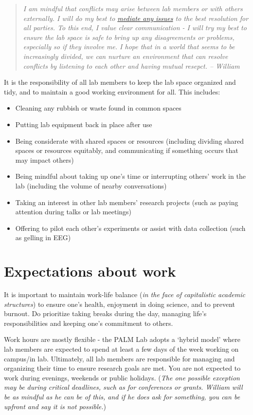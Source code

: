 \documentclass[
]{book}
\providecommand{\tightlist}{%
  \setlength{\itemsep}{0pt}\setlength{\parskip}{0pt}}
\begin{document}
\begin{quote}
\emph{I am mindful that conflicts may arise between lab members or with others externally. I will do my best to \protect\hyperlink{conflicts}{mediate any issues} to the best resolution for all parties. To this end, I value clear communication - I will try my best to ensure the lab space is safe to bring up any disagreements or problems, especially so if they involve me. I hope that in a world that seems to be increasingly divided, we can nurture an environment that can resolve conflicts by listening to each other and having mutual resepct. -- William}
\end{quote}

It is the responsibility of all lab members to keep the lab space organized and tidy, and to maintain a good working environment for all. This includes:

\begin{itemize}
\tightlist
\item
  Cleaning any rubbish or waste found in common spaces
\item
  Putting lab equipment back in place after use
\item
  Being considerate with shared spaces or resources (including dividing shared spaces or resources equitably, and communicating if something occurs that may impact others)
\item
  Being mindful about taking up one's time or interrupting others' work in the lab (including the volume of nearby conversations)
\item
  Taking an interest in other lab members' research projects (such as paying attention during talks or lab meetings)
\item
  Offering to pilot each other's experiments or assist with data collection (such as gelling in EEG)
\end{itemize}

\hypertarget{lab-work}{%
\section{Expectations about work}\label{lab-work}}

It is important to maintain work-life balance (\emph{in the face of capitalistic academic structures}) to ensure one's health, enjoyment in doing science, and to prevent burnout. Do prioritize taking breaks during the day, managing life's responsibilities and keeping one's commitment to others.

Work hours are mostly flexible - the PALM Lab adopts a `hybrid model' where lab members are expected to spend at least a few days of the week working on campus/in lab. Ultimately, all lab members are responsible for managing and organizing their time to ensure research goals are met. You are not expected to work during evenings, weekends or public holidays. (\emph{The one possible exception may be during critical deadlines, such as for conferences or grants. William will be as mindful as he can be of this, and if he does ask for something, you can be upfront and say it is not possible.})
\end{document}
